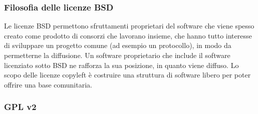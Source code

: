 \subsubsection{Filosofia delle licenze BSD}

Le licenze BSD permettono sfruttamenti proprietari del software che viene spesso creato come prodotto di consorzi che lavorano insieme, che hanno tutto interesse di sviluppare un progetto comune (ad esempio un protocollo), in modo da permetterne la diffusione. Un software proprietario che include il software licenziato sotto BSD ne rafforza la sua posizione, in quanto viene diffuso. Lo scopo delle licenze copyleft \`e costruire una struttura di software libero per poter offrire una base comunitaria.

\newpage

\subsubsection{GPL v2}

